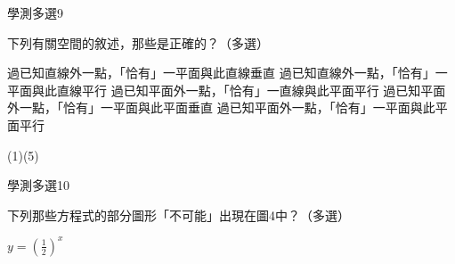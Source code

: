 \begin{QUESTIONS}
\begin{QUESTION}
        \begin{QSOLLIST}
        \end{QSOLLIST}
        \begin{QEMPTYSPACE}
        \end{QEMPTYSPACE}
    \end{QUESTION}
    \begin{QUESTION}
        \begin{ExamInfo}{83}{學測}{多選}{9}
        \end{ExamInfo}
        \begin{ExamAnsRateInfo}{}{}{}{}
        \end{ExamAnsRateInfo}
        \begin{QBODY}
            下列有關空間的敘述，那些是正確的？（多選）
            \begin{QOPS}
            \QOP 過已知直線外一點，「恰有」一平面與此直線垂直
            \QOP 過已知直線外一點，「恰有」一平面與此直線平行
            \QOP 過已知平面外一點，「恰有」一直線與此平面平行
            \QOP 過已知平面外一點，「恰有」一平面與此平面垂直
            \QOP 過已知平面外一點，「恰有」一平面與此平面平行
            \end{QOPS}        
        \end{QBODY}
        \begin{QFROMS}
        \end{QFROMS}
        \begin{QTAGS}\end{QTAGS}
        \begin{QANS}
            (1)(5)
        \end{QANS}
        \begin{QSOLLIST}
        \end{QSOLLIST}
        \begin{QEMPTYSPACE}
        \end{QEMPTYSPACE}
    \end{QUESTION}
    \begin{QUESTION}
        \begin{ExamInfo}{83}{學測}{多選}{10}
        \end{ExamInfo}
        \begin{ExamAnsRateInfo}{}{}{}{}
        \end{ExamAnsRateInfo}
        \begin{QBODY}
            下列那些方程式的部分圖形「不可能」出現在圖4中？（多選）
            \begin{QOPS}
            \QOP $y={{\left( \frac{1}{2} \right)}^{x}}$

\end{QOPS}
\end{QBODY}
\end{QUESTION}
\end{QUESTIONS}
